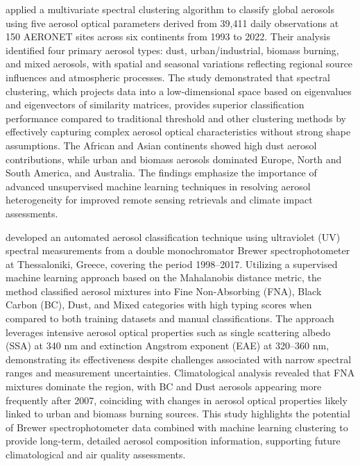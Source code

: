 \documentclass[11pt]{article}
\begin{document}
\citet{ningombam2024aerosol} applied a multivariate spectral clustering algorithm to classify global aerosols using five aerosol optical parameters derived from 39,411 daily observations at 150 AERONET sites across six continents from 1993 to 2022. Their analysis identified four primary aerosol types: dust, urban/industrial, biomass burning, and mixed aerosols, with spatial and seasonal variations reflecting regional source influences and atmospheric processes. The study demonstrated that spectral clustering, which projects data into a low-dimensional space based on eigenvalues and eigenvectors of similarity matrices, provides superior classification performance compared to traditional threshold and other clustering methods by effectively capturing complex aerosol optical characteristics without strong shape assumptions. The African and Asian continents showed high dust aerosol contributions, while urban and biomass aerosols dominated Europe, North and South America, and Australia. The findings emphasize the importance of advanced unsupervised machine learning techniques in resolving aerosol heterogeneity for improved remote sensing retrievals and climate impact assessments.

\citet{siomos2020automated} developed an automated aerosol classification technique using ultraviolet (UV) spectral measurements from a double monochromator Brewer spectrophotometer at Thessaloniki, Greece, covering the period 1998–2017. Utilizing a supervised machine learning approach based on the Mahalanobis distance metric, the method classified aerosol mixtures into Fine Non-Absorbing (FNA), Black Carbon (BC), Dust, and Mixed categories with high typing scores when compared to both training datasets and manual classifications. The approach leverages intensive aerosol optical properties such as single scattering albedo (SSA) at 340 nm and extinction Angstrom exponent (EAE) at 320–360 nm, demonstrating its effectiveness despite challenges associated with narrow spectral ranges and measurement uncertainties. Climatological analysis revealed that FNA mixtures dominate the region, with BC and Dust aerosols appearing more frequently after 2007, coinciding with changes in aerosol optical properties likely linked to urban and biomass burning sources. This study highlights the potential of Brewer spectrophotometer data combined with machine learning clustering to provide long-term, detailed aerosol composition information, supporting future climatological and air quality assessments.
\end{document}
